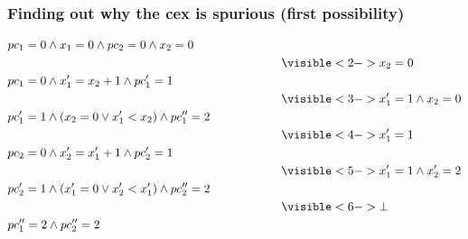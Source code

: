\documentclass{beamer}
\begin{document}
\begin{frame}
  \frametitle{Finding out why the cex is spurious (first possibility)}

\begin{align*}
& pc_1=0 \land x_1=0 \land pc_2=0 \land x_2=0 \\
& \hspace{8cm} \visible<2->{x_2=0} \\
& pc_1=0 \land x_1' = x_2 + 1 \land pc_1' = 1 \\
& \hspace{8cm} \visible<3->{x_1' = 1 \land x_2 = 0} \\
& pc_1'=1 \land (x_2=0 \lor x_1'<x_2) \land pc_1'' = 2 \\
& \hspace{8cm} \visible<4->{x_1' = 1}\\
& pc_2=0 \land x_2' = x_1' + 1 \land pc_2' = 1 \\
& \hspace{8cm} \visible<5->{x_1' = 1 \land x_2' = 2} \\
& pc_2'=1 \land (x_1'=0 \lor x_2'<x_1') \land pc_2'' = 2 \\
& \hspace{8cm} \visible<6->{\bot}\\
& pc_1''=2 \land pc_2''=2
\end{align*}
\end{frame}
\end{document}
